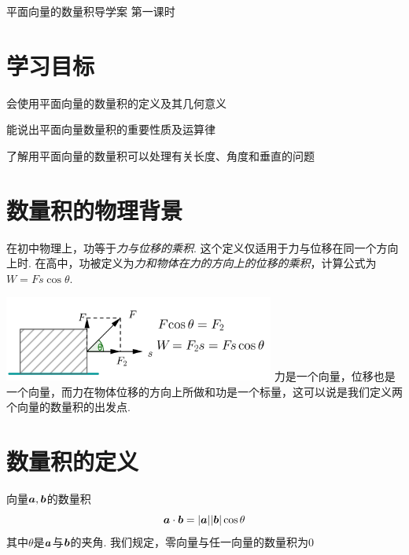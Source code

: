 \documentclass[twoside,12pt]{article}\usepackage[includemp=true,marginparsep=.5cm,marginparwidth=3cm,left=1.7cm,right=.7cm,top=2cm,bottom=1.5cm]{geometry}\newtheorem{Definition}{定义}[section]
\begin{document}
\def\myp#1{\par\vspace*{1ex}\noindent{\heiti#1}\par}\def\myskip{\par\vspace*{.7in}}
\centerline{\heiti\Large 平面向量的数量积导学案 第一课时}

\section{学习目标}
 \begin{itemize*}
    \item 会使用平面向量的数量积的定义及其几何意义
    \item 能说出平面向量数量积的重要性质及运算律
    \item 了解用平面向量的数量积可以处理有关长度、角度和垂直的问题
  \end{itemize*}

\section{数量积的物理背景}
在初中物理上，功等于\textsl{力与位移的乘积}. 这个定义仅适用于力与位移在同一个方向上时. 在高中，功被定义为\textsl{力和物体在力的方向上的位移的乘积}，计算公式为 $W=Fs\cos\theta$.\par \includegraphics[width=3.5in]{d241-01.png}
力是一个向量，位移也是一个向量，而力在物体位移的方向上所做和功是一个标量，这可以说是我们定义两个向量的数量积的出发点.

 
\section{数量积的定义}
\begin{definition}向量$\bm a,\bm b$的数量积$$\bm a\cdot\bm b=|\bm a||\bm b|\cos\theta$$
其中$\theta$是$\bm a$与$\bm b$的夹角. 我们规定，零向量与任一向量的数量积为$0$
\end{definition}
\end{document}
